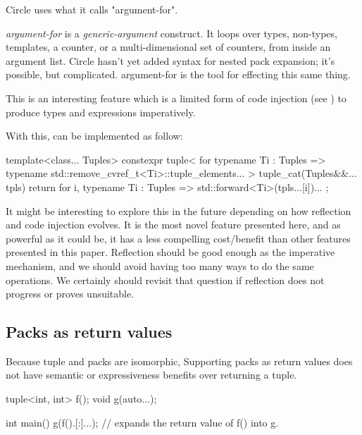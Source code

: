 \documentclass{wg21}
\begin{document}
Circle uses what it calls "argument-for".

\begin{quoteblock}
\emph{argument-for} is a  \emph{generic-argument} construct. It loops over types, non-types, templates, a counter, or a multi-dimensional set of counters, from inside an argument list. Circle hasn't yet added syntax for nested pack expansion; it's possible, but complicated. argument-for is the tool for effecting this same thing.
\end{quoteblock}

This is an interesting feature which is a limited form of code injection (see ) to produce types and expressions imperatively.

With this,  can be implemented as follow:

\begin{colorblock}
    template<class... Tuples>
    constexpr tuple<
    for typename Ti : Tuples =>
        typename std::remove_cvref_t<Ti>::tuple_elements...
    >
    tuple_cat(Tuples&&... tpls) {
        return {
            for i, typename Ti : Tuples => std::forward<Ti>(tpls...[i])...
        };
    }
\end{colorblock}

It might be interesting to explore this in the future depending on how reflection and code injection evolves.
It is the most novel feature presented here, and as powerful as it could be, it has a less compelling cost/benefit than other features presented in this paper.
Reflection should be good enough as the imperative mechanism, and we should avoid having too many ways to do the same operations.
We certainly should revisit that question if reflection does not progress or proves unsuitable.

\subsection{Packs as return values}
\label{sec:packasreturn}

Because tuple and packs are isomorphic, Supporting packs as return values does not have semantic or expressiveness benefits over returning a tuple.

\begin{colorblock}
tuple<int, int> f();
void g(auto...);

int main() {
    g(f().[:]...); // expands the return value of f() into g.
}
\end{colorblock}
\end{document}

